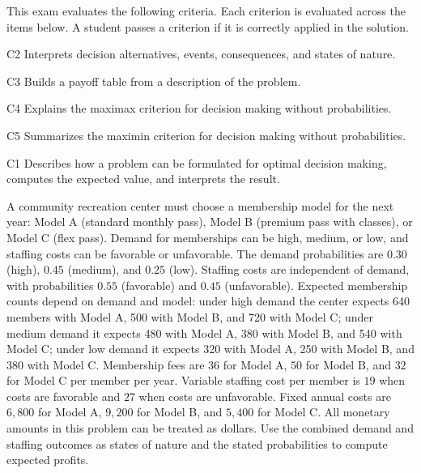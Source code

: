 

	
	This exam evaluates the following criteria. Each criterion is evaluated across the items below. A student passes a criterion if it is correctly applied in the solution.
	\begin{ExamCriteria}
		\item C2 Interprets decision alternatives, events, consequences, and states of nature.
		\item C3 Builds a payoff table from a description of the problem.
		\item C4 Explains the maximax criterion for decision making without probabilities.
		\item C5 Summarizes the maximin criterion for decision making without probabilities.
		\item C1 Describes how a problem can be formulated for optimal decision making, computes the expected value, and interprets the result.
	\end{ExamCriteria}
	\begin{ExamProblems}
		\item A community recreation center must choose a membership model for the next year: Model A (standard monthly pass),
		Model B (premium pass with classes), or Model C (flex pass). Demand for memberships can be high, medium, or low, and staffing costs can be favorable or unfavorable. The demand probabilities are $0.30$ (high), $0.45$ (medium), and $0.25$ (low). Staffing costs are independent of demand, with probabilities $0.55$ (favorable) and $0.45$ (unfavorable). Expected membership counts depend on demand and model: under high demand the center expects 640 members with Model A, 500 with Model B, and 720 with Model C; under medium demand it expects 480 with Model A, 380 with Model B, and 540 with Model C; under low demand it expects 320 with Model A, 250 with Model B, and 380 with Model C. Membership fees are $36$ for Model A, $50$ for Model B, and $32$ for Model C per member per year. Variable staffing cost per member is $19$ when costs are favorable and $27$ when costs are unfavorable. Fixed annual costs are $6{,}800$ for Model A, $9{,}200$ for Model B, and $5{,}400$ for Model C. All monetary amounts in this problem can be treated as dollars. Use the combined demand and staffing outcomes as states of nature and the stated probabilities to compute expected profits.
		
	\end{ExamProblems}

